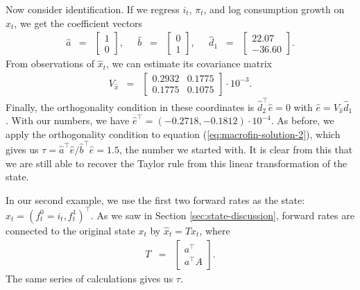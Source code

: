 \documentclass[12pt]{article}
\begin{document}
{Now consider identification.
If we regress $i_t$, $\pi_t$, and log consumption growth on $\hat{x}_t$,
we get the coefficient vectors
\begin{eqnarray*}
    \hat{a} &=&
    \left[
        \begin{array}{r}
        1 \\ 0
        \end{array}
    \right] ,
    \;\;\;\;\;
    \hat{b} \;\;=\;\;
    \left[
        \begin{array}{r}
        0 \\ 1
        \end{array}
    \right] ,
        \;\;\;\;\;
    \hat{d}_1 \;\;=\;\;
    \left[
        \begin{array}{r}
         22.07 \\  -36.60
        \end{array}
    \right] .
\end{eqnarray*}
From observations of $\hat{x}_t$, we can estimate its covariance matrix
\begin{eqnarray*}
    V_{\hat{x}} &=&
       \left[
        \begin{array}{rr}
         0.2932 &   0.1775 \\  0.1775  &  0.1075
        \end{array}
        \right] \cdot 10^{-3} .
\end{eqnarray*}
Finally, the orthogonality condition in these coordinates
is $\hat{d}_2^{\top} \hat{e} = 0$ with $\hat{e} = V_{\hat{x}} \hat{d}_1 $.
With our numbers, we have $\hat{e}^\top = (-0.2718, -0.1812) \cdot 10^{-4}$.
%
As before, we apply the orthogonality condition to
equation (\ref{eq:macrofin-solution-2}), which gives us
$\tau = \hat{a}^{\top} \hat{e} / \hat{b}^{\top} \hat{e} = 1.5 $,
the number we started with.
It is clear from this that we are still able to recover the Taylor rule
from this linear transformation of the state.


In our second example, we use the first two forward rates as the state:
$\hat{x}_t = (f_t^0=i_t, f_t^1)^\top$.
As we saw in Section \ref{sec:state-discussion},
forward rates are connected to the original state $x_t$ by
$\hat{x}_t = T x_t$, where
\begin{eqnarray*}
    T &=&
        \left[
        \begin{array}{c}
        a^\top \\ a^\top A
        \end{array}
        \right] .
\end{eqnarray*}
The same series of calculations gives us $\tau$.



}
\end{document}
